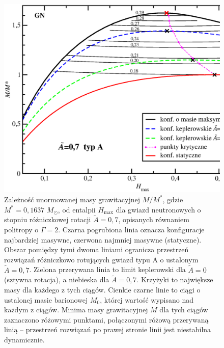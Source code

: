 \documentclass{bachelor_thesis}
\begin{document}
            \begin{figure}[h!]
            \centering
            \includegraphics[scale=.5]{figures/RysMofHpolA07.eps}
            \caption{Zależność unormowanej masy grawitacyjnej $M/M^*$, gdzie $M^*=0,1637$ $M_\odot$, od entalpii $H_{\textrm{max}}$ dla gwiazd neutronowych o stopniu różniczkowej rotacji $\tilde{A}=0,7$, opisanych równaniem politropy o $\Gamma=2$. Czarna pogrubiona linia oznacza konfiguracje najbardziej masywne, czerwona najmniej masywne (statyczne). Obszar pomiędzy tymi dwoma liniami ogranicza przestrzeń rozwiązań różniczkowo rotujących gwiazd typu A o ustalonym $\tilde{A}=0,7$. Zielona przerywana linia to limit keplerowski dla $\tilde{A}=0$ (sztywna rotacja), a niebieska dla $\tilde{A}=0,7$. Krzyżyki to największe masy dla każdego z tych ciągów. Cienkie czarne linie to ciągi o ustalonej masie barionowej $M_0$, której wartość wypisano nad każdym z ciągów. Minima masy grawitacyjnej $M$ dla tych ciągów zaznaczono różowymi punktami, połączonymi różową przerywaną linią -- przestrzeń rozwiązań po prawej stronie linii jest niestabilna dynamicznie.}
            \label{RysMofHpolA07}
            \end{figure}
\end{document}
